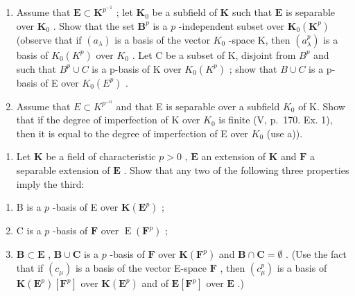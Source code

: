 \begin{enumerate}
\def\labelenumi{\alph{enumi})}
\item
  Assume that \(\mathbf{E} \subset \mathbf{K}^{p^{-1}}\) ; let \(\mathbf{K}_0\) be a subfield of \(\mathbf{K}\) such that \(\mathbf{E}\) is separable over \(\mathbf{K}_0\) . Show that the set \(\mathbf{B}^p\) is a \(p\) -independent subset over \(\mathbf{K}_0(\mathbf{K}^p)\) (observe that if \((a_{\lambda})\) is a basis of the vector \(K_{0}\) -space K, then \((a_{\lambda}^{p})\) is a basis of \(K_{0}(K^{p})\) over \(K_{0}\) . Let C be a subset of K, disjoint from \(B^{p}\) and such that \(B^{p} \cup C\) is a p-basis of K over \(K_{0}(K^{p})\) ; show that \(B \cup C\) is a p-basis of E over \(K_{0}(E^{p})\) .
\item
  Assume that \(E \subset K^{p^{-n}}\) and that E is separable over a subfield \(K_{0}\) of K. Show that if the degree of imperfection of K over \(K_{0}\) is finite (V, p.~170. Ex. 1), then it is equal to the degree of imperfection of E over \(K_{0}\) (use a)).
\end{enumerate}

\begin{enumerate}
\def\labelenumi{\arabic{enumi})}
\setcounter{enumi}{1}
\tightlist
\item
  Let \(\mathbf{K}\) be a field of characteristic \(p > 0\) , \(\mathbf{E}\) an extension of \(\mathbf{K}\) and \(\mathbf{F}\) a separable extension of \(\mathbf{E}\) . Show that any two of the following three properties imply the third:
\end{enumerate}

\begin{enumerate}
\def\labelenumi{\alph{enumi})}
\item
  B is a \(p\) -basis of E over \(\mathbf{K}(\mathbf{E}^p)\) ;
\item
  C is a \(p\) -basis of \(\mathbf{F}\) over \(\operatorname{E}(\mathbf{F}^p)\) ;
\item
  \(\mathbf{B} \subset \mathbf{E}\) , \(\mathbf{B} \cup \mathbf{C}\) is a \(p\) -basis of \(\mathbf{F}\) over \(\mathbf{K}(\mathbf{F}^p)\) and \(\mathbf{B} \cap \mathbf{C} = \emptyset\) . (Use the fact that if \((c_{\mu})\) is a basis of the vector E-space \(\mathbf{F}\) , then \((c_{\mu}^p)\) is a basis of \(\mathbf{K}(\mathbf{E}^p)[\mathbf{F}^p]\) over \(\mathbf{K}(\mathbf{E}^p)\) and of \(\mathbf{E}[\mathbf{F}^p]\) over \(\mathbf{E}\) .)
\end{enumerate}


